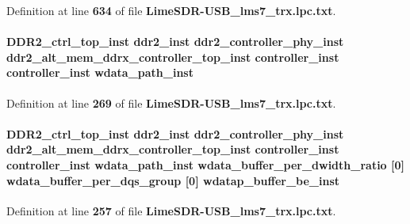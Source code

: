 Definition at line {\bf 634} of file {\bf Lime\+S\+D\+R-\/\+U\+S\+B\+\_\+lms7\+\_\+trx.\+lpc.\+txt}.

\paragraph[{wdata\+\_\+path\+\_\+inst}]{ {\bf D\+D\+R2\+\_\+ctrl\+\_\+top\+\_\+inst} {\bf ddr2\+\_\+inst} {\bf ddr2\+\_\+controller\+\_\+phy\+\_\+inst} {\bf ddr2\+\_\+alt\+\_\+mem\+\_\+ddrx\+\_\+controller\+\_\+top\+\_\+inst} {\bf controller\+\_\+inst} {\bf controller\+\_\+inst} wdata\+\_\+path\+\_\+inst}\label{LimeSDR-USB__lms7__trx_8lpc_8txt_a9c8b699b3d126c587c182f599867b70c}


Definition at line {\bf 269} of file {\bf Lime\+S\+D\+R-\/\+U\+S\+B\+\_\+lms7\+\_\+trx.\+lpc.\+txt}.

\paragraph[{wdatap\+\_\+buffer\+\_\+be\+\_\+inst}]{ {\bf D\+D\+R2\+\_\+ctrl\+\_\+top\+\_\+inst} {\bf ddr2\+\_\+inst} {\bf ddr2\+\_\+controller\+\_\+phy\+\_\+inst} {\bf ddr2\+\_\+alt\+\_\+mem\+\_\+ddrx\+\_\+controller\+\_\+top\+\_\+inst} {\bf controller\+\_\+inst} {\bf controller\+\_\+inst} {\bf wdata\+\_\+path\+\_\+inst} wdata\+\_\+buffer\+\_\+per\+\_\+dwidth\+\_\+ratio [0] wdata\+\_\+buffer\+\_\+per\+\_\+dqs\+\_\+group [0] wdatap\+\_\+buffer\+\_\+be\+\_\+inst}\label{LimeSDR-USB__lms7__trx_8lpc_8txt_a7dbca58bcdbc0fb58ebfea3626ea0ba6}


Definition at line {\bf 257} of file {\bf Lime\+S\+D\+R-\/\+U\+S\+B\+\_\+lms7\+\_\+trx.\+lpc.\+txt}.

